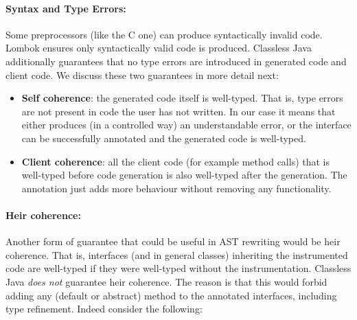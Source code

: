 


\paragraph{Syntax and Type Errors:}
Some preprocessors (like the C one) can produce syntactically invalid code.
Lombok ensures only syntactically valid code is produced. %
Classless Java additionally guarantees that no type errors are introduced
in generated code and client code. We discuss these two guarantees in
more detail next:

\begin{itemize}

\item{\bf Self coherence}: the generated code itself is well-typed. That is,
  type errors are not present in code the user has not written.
In our case it means that either \mixin{} produces (in a controlled way) an
understandable error, or the interface can be successfully annotated and the generated code is well-typed.

\item{\bf Client coherence}: all the client code (for example method calls)
  that is well-typed before code generation is also well-typed after the generation.
The annotation just adds more behaviour without removing any functionality.

\end{itemize}

\paragraph{Heir coherence:} Another form of guarantee that could be
useful in AST rewriting would be heir coherence. That is, interfaces
(and in general classes) inheriting the instrumented code are
well-typed if they were well-typed without the instrumentation.
Classless Java \emph{does not} guarantee heir coherence.  The reason
is that this would forbid adding any (default or abstract) method to
the annotated interfaces, including type refinement. Indeed consider
the following:

